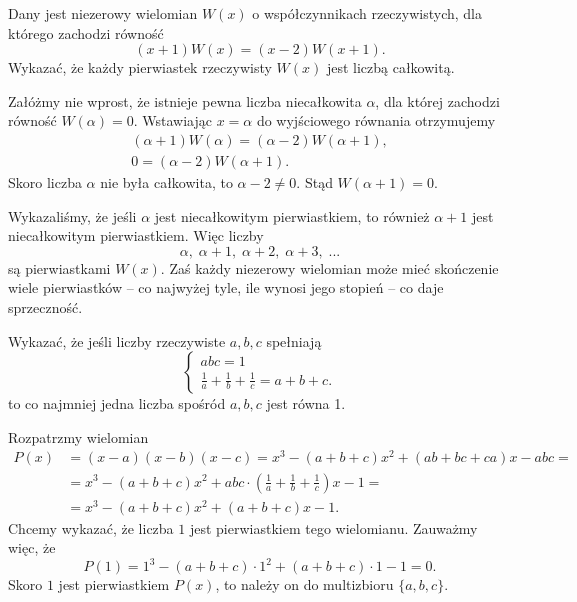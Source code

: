 \newpage
{}

\begin{problem}{1}
    Dany jest niezerowy wielomian $W(x)$ o współczynnikach rzeczywistych, dla którego zachodzi równość
    \[
        (x + 1)W(x) = (x - 2)W(x + 1).
    \]
    Wykazać, że każdy pierwiastek rzeczywisty $W(x)$ jest liczbą całkowitą.
\end{problem}

\noindent
Załóżmy nie wprost, że istnieje pewna liczba niecałkowita $\alpha$, dla której zachodzi równość $W(\alpha) = 0$. Wstawiając $x = \alpha$ do wyjściowego równania otrzymujemy
\begin{align*}
    (\alpha + 1)W(\alpha) = (\alpha - 2)W(\alpha + 1), \\
    0 = (\alpha - 2)W(\alpha + 1).
\end{align*}
Skoro liczba $\alpha$ nie była całkowita, to $\alpha - 2 \neq 0$. Stąd $W(\alpha + 1) = 0$.

\vspace{10 px}
\noindent
Wykazaliśmy, że jeśli $\alpha$ jest niecałkowitym pierwiastkiem, to również $\alpha + 1$ jest niecałkowitym pierwiastkiem. Więc liczby
\[
    \alpha, \; \alpha + 1, \; \alpha + 2, \; \alpha + 3, \; ...
\]
są pierwiastkami $W(x)$. Zaś każdy niezerowy wielomian może mieć skończenie wiele pierwiastków -- co najwyżej tyle, ile wynosi jego stopień -- co daje sprzeczność.


\begin{problem}{2}
    Wykazać, że jeśli liczby rzeczywiste $a, b, c$ spełniają
    \[
    \begin{cases}
        abc = 1 \\
        \frac{1}{a} + \frac{1}{b} + \frac{1}{c} = a + b + c.
    \end{cases}
    \]
    to co najmniej jedna liczba spośród $a, b, c$ jest równa 1.
\end{problem}

\noindent
Rozpatrzmy wielomian
\begin{align*}
    P(x) &= (x - a)(x - b)(x - c) = x^3 - (a + b + c)x^2 + (ab + bc + ca)x - abc = \\
    &= x^3 - (a + b + c)x^2 + abc \cdot \left(\frac{1}{a} + \frac{1}{b} + \frac{1}{c}\right)x - 1 = \\
    &= x^3 - (a + b + c)x^2 + (a + b + c)x - 1.
\end{align*}
Chcemy wykazać, że liczba $1$ jest pierwiastkiem tego wielomianu. Zauważmy więc, że
\[
    P(1) = 1^3 - (a + b + c) \cdot 1^2 + (a + b + c)\cdot 1 - 1 = 0.
\]
Skoro $1$ jest pierwiastkiem $P(x)$, to należy on do multizbioru $\{a, b, c\}$.

